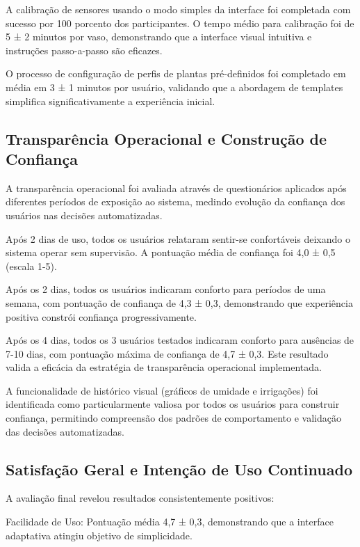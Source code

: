 \documentclass[twoside,english,brazilian]{UNISINOSmonografia}
\begin{document}
A calibração de sensores usando o modo simples da interface foi completada com sucesso por 100 porcento dos participantes. O tempo médio para calibração foi de 5 ± 2 minutos por vaso, demonstrando que a interface visual intuitiva e instruções passo-a-passo são eficazes.

O processo de configuração de perfis de plantas pré-definidos foi completado em média em 3 ± 1 minutos por usuário, validando que a abordagem de templates simplifica significativamente a experiência inicial.

\subsection{Transparência Operacional e Construção de Confiança}

A transparência operacional foi avaliada através de questionários aplicados após diferentes períodos de exposição ao sistema, medindo evolução da confiança dos usuários nas decisões automatizadas.

Após 2 dias de uso, todos os usuários relataram sentir-se confortáveis deixando o sistema operar sem supervisão. A pontuação média de confiança foi 4,0 ± 0,5 (escala 1-5).

Após os 2 dias, todos os usuários indicaram conforto para períodos de uma semana, com pontuação de confiança de 4,3 ± 0,3, demonstrando que experiência positiva constrói confiança progressivamente.

Após os 4 dias, todos os 3 usuários testados indicaram conforto para ausências de 7-10 dias, com pontuação máxima de confiança de 4,7 ± 0,3. Este resultado valida a eficácia da estratégia de transparência operacional implementada.

A funcionalidade de histórico visual (gráficos de umidade e irrigações) foi identificada como particularmente valiosa por todos os usuários para construir confiança, permitindo compreensão dos padrões de comportamento e validação das decisões automatizadas.

\subsection{Satisfação Geral e Intenção de Uso Continuado}

A avaliação final revelou resultados consistentemente positivos:

Facilidade de Uso: Pontuação média 4,7 ± 0,3, demonstrando que a interface adaptativa atingiu objetivo de simplicidade.
\end{document}
